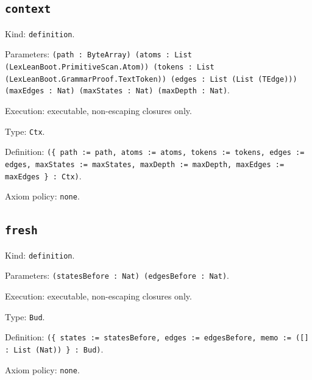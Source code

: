 \documentclass[11pt]{article}
\begin{document}
\subsection*{\texttt{context}}
\noindent Kind: \texttt{definition}.\par
\noindent Parameters: \texttt{(path : ByteArray) (atoms : List (LexLeanBoot.PrimitiveScan.Atom)) (tokens : List (LexLeanBoot.GrammarProof.TextToken)) (edges : List (List (TEdge))) (maxEdges : Nat) (maxStates : Nat) (maxDepth : Nat)}.\par
\noindent Execution: executable, non-escaping closures only.\par
\noindent Type: \texttt{Ctx}.\par
\noindent Definition: \texttt{(\{ path := path, atoms := atoms, tokens := tokens, edges := edges, maxStates := maxStates, maxDepth := maxDepth, maxEdges := maxEdges \} : Ctx)}.\par
\noindent Axiom policy: \texttt{none}.\par
\subsection*{\texttt{fresh}}
\noindent Kind: \texttt{definition}.\par
\noindent Parameters: \texttt{(statesBefore : Nat) (edgesBefore : Nat)}.\par
\noindent Execution: executable, non-escaping closures only.\par
\noindent Type: \texttt{Bud}.\par
\noindent Definition: \texttt{(\{ states := statesBefore, edges := edgesBefore, memo := ([] : List (Nat)) \} : Bud)}.\par
\noindent Axiom policy: \texttt{none}.\par
\end{document}
